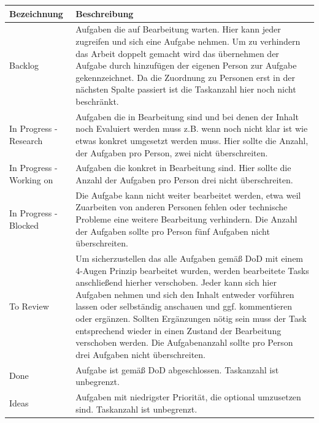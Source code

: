 \begin{minipage}{\textwidth}
\begin{center}
\begin{tabular}{p{2.5cm}p{13cm}}
\toprule
Bezeichnung & Beschreibung \\
\midrule
Backlog & Aufgaben die auf Bearbeitung warten. Hier kann jeder zugreifen und sich eine Aufgabe nehmen. Um zu verhindern das Arbeit doppelt gemacht wird das übernehmen der Aufgabe durch hinzufügen der eigenen Person zur Aufgabe gekennzeichnet. Da die Zuordnung zu Personen erst in der nächsten Spalte passiert ist die Taskanzahl hier noch nicht beschränkt. \\
In Progress - Research & Aufgaben die in Bearbeitung sind und bei denen der Inhalt noch Evaluiert werden muss z.B. wenn noch nicht klar ist wie etwas konkret umgesetzt werden muss. Hier sollte die Anzahl, der Aufgaben pro Person, zwei nicht überschreiten. \\
In Progress - Working on & Aufgaben die konkret in Bearbeitung sind. Hier sollte die Anzahl der Aufgaben pro Person drei nicht überschreiten. \\
In Progress - Blocked & Die Aufgabe kann nicht weiter bearbeitet werden, etwa weil Zuarbeiten von anderen Personen fehlen oder technische Probleme eine weitere Bearbeitung verhindern. Die Anzahl der Aufgaben sollte pro Person fünf Aufgaben nicht überschreiten. \\
To Review & Um sicherzustellen das alle Aufgaben gemäß DoD mit einem 4-Augen Prinzip bearbeitet wurden, werden bearbeitete Tasks anschließend hierher verschoben. Jeder kann sich hier Aufgaben nehmen und sich den Inhalt entweder vorführen lassen oder selbständig anschauen und ggf. kommentieren oder ergänzen. Sollten Ergänzungen nötig sein muss der Task entsprechend wieder in einen Zustand der Bearbeitung verschoben werden. Die Aufgabenanzahl sollte pro Person drei Aufgaben nicht überschreiten. \\
Done & Aufgabe ist gemäß DoD abgeschlossen. Taskanzahl ist unbegrenzt. \\
Ideas & Aufgaben mit niedrigster Priorität, die optional umzusetzen sind. Taskanzahl ist unbegrenzt. \\
\bottomrule
\end{tabular}
\end{center}
\end{minipage}

